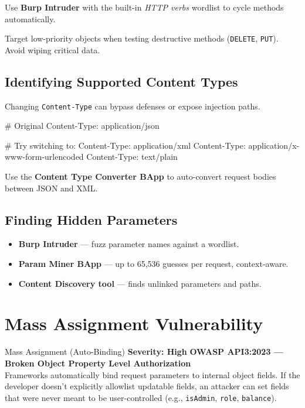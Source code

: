 \documentclass[11pt]{article}
\newcommand{\sev}[1]{\textbf{\textcolor{critical}{Severity: #1}}}
\newcommand{\owasp}[1]{\textbf{\textcolor{httpblue}{#1}}}
\begin{document}
Use \textbf{Burp Intruder} with the built-in \textit{HTTP verbs} wordlist to cycle methods automatically.

\begin{notebox}[Warning]
Target low-priority objects when testing destructive methods (\texttt{DELETE}, \texttt{PUT}). Avoid wiping critical data.
\end{notebox}

\subsection{Identifying Supported Content Types}

Changing \texttt{Content-Type} can bypass defenses or expose injection paths.

\begin{httpbox}
# Original
Content-Type: application/json

# Try switching to:
Content-Type: application/xml
Content-Type: application/x-www-form-urlencoded
Content-Type: text/plain
\end{httpbox}

Use the \textbf{Content Type Converter BApp} to auto-convert request bodies between JSON and XML.

\subsection{Finding Hidden Parameters}

\begin{itemize}
  \item \textbf{Burp Intruder} --- fuzz parameter names against a wordlist.
  \item \textbf{Param Miner BApp} --- up to 65,536 guesses per request, context-aware.
  \item \textbf{Content Discovery tool} --- finds unlinked parameters and paths.
\end{itemize}

\section{Mass Assignment Vulnerability}

\begin{vulnbox}{Mass Assignment (Auto-Binding)}
\sev{High} \quad \owasp{OWASP API3:2023 --- Broken Object Property Level Authorization}\\[6pt]
Frameworks automatically bind request parameters to internal object fields. If the developer doesn't explicitly allowlist updatable fields, an attacker can set fields that were never meant to be user-controlled (e.g., \texttt{isAdmin}, \texttt{role}, \texttt{balance}).
\end{vulnbox}
\end{document}
